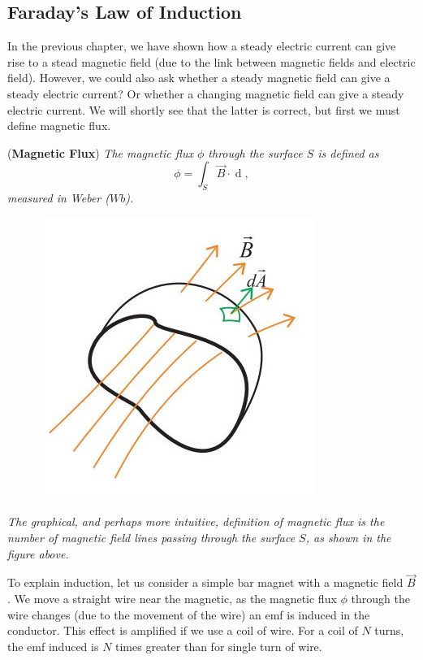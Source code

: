 \subsection{Faraday's Law of Induction}

In the previous chapter, we have shown how a steady electric current can give rise to a stead magnetic field (due to the link between magnetic fields and electric field). However, we could also ask whether a steady magnetic field can give a steady electric current? Or whether a changing magnetic field can give a steady electric current. We will shortly see that the latter is correct, but first we must define magnetic flux.

\begin{definition}{(\textbf{Magnetic Flux})}
\textit{The magnetic flux $\phi$ through the surface $S$ is defined as}
\begin{equation}
    \phi = \int_S \vec{B} \cdot \mathop{\mathrm{d}\vec{A}},
\end{equation}
\textit{measured in Weber ($Wb$).}
\begin{figure}[h!]
    \centering
    \includegraphics[scale=0.5]{notes/images/Magnetic-Flux.JPG}
\end{figure}
\FloatBarrier
\textit{The graphical, and perhaps more intuitive, definition of magnetic flux is the number of magnetic field lines passing through the surface $S$, as shown in the figure above.}
\end{definition}

To explain induction, let us consider a simple bar magnet with a magnetic field $\vec{B}$. We move a straight wire near the magnetic, as the magnetic flux $\phi$ through the wire changes (due to the movement of the wire) an emf is induced in the conductor. This effect is amplified if we use a coil of wire. For a coil of $N$ turns, the emf induced is $N$ times greater than for single turn of wire.

